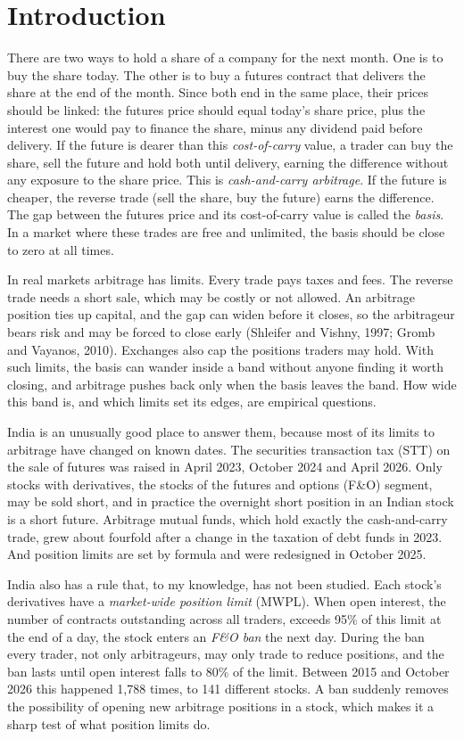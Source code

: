 \section{Introduction}\label{sec:intro}

There are two ways to hold a share of a company for the next month. One is to buy the share today. The other is to buy a
futures contract that delivers the share at the end of the month. Since both end in the same place, their prices should
be linked: the futures price should equal today's share price, plus the interest one would pay to finance the share,
minus any dividend paid before delivery. If the future is dearer than this \emph{cost-of-carry} value, a trader can buy
the share, sell the future and hold both until delivery, earning the difference without any exposure to the share
price. This is \emph{cash-and-carry arbitrage}. If the future is cheaper, the reverse trade (sell the share, buy the
future) earns the difference. The gap between the futures price and its cost-of-carry value is called the
\emph{basis}. In a market where these trades are free and unlimited, the basis should be close to zero at all times.

In real markets arbitrage has limits. Every trade pays taxes and fees. The reverse trade needs a short sale, which may be
costly or not allowed. An arbitrage position ties up capital, and the gap can widen before it closes, so the
arbitrageur bears risk and may be forced to close early (Shleifer and Vishny, 1997; Gromb and Vayanos, 2010).
Exchanges also cap the positions traders may hold. With such limits, the basis can wander inside a band without anyone
finding it worth closing, and arbitrage pushes back only when the basis leaves the band. How wide this band is, and
which limits set its edges, are empirical questions.

India is an unusually good place to answer them, because most of its limits to arbitrage have changed on known dates.
The securities transaction tax (STT) on the sale of futures was raised in April 2023, October 2024 and April 2026. Only
stocks with derivatives, the stocks of the futures and options (F\&O) segment, may be sold short, and in practice the
overnight short position in an Indian stock is a short future. Arbitrage mutual funds, which hold exactly the
cash-and-carry trade, grew about fourfold after a change in the taxation of debt funds in 2023. And position limits are
set by formula and were redesigned in October 2025.

India also has a rule that, to my knowledge, has not been studied. Each stock's derivatives have a
\emph{market-wide position limit} (MWPL). When open interest, the number of contracts outstanding across all traders,
exceeds 95\% of this limit at the end of a day, the stock enters an \emph{F\&O ban} the next day. During the ban every
trader, not only arbitrageurs, may only trade to reduce positions, and the ban lasts until open interest falls to 80\%
of the limit. Between 2015 and October 2026 this happened 1,788 times, to 141 different stocks. A ban suddenly removes the
possibility of opening new arbitrage positions in a stock, which makes it a sharp test of what position limits do.

